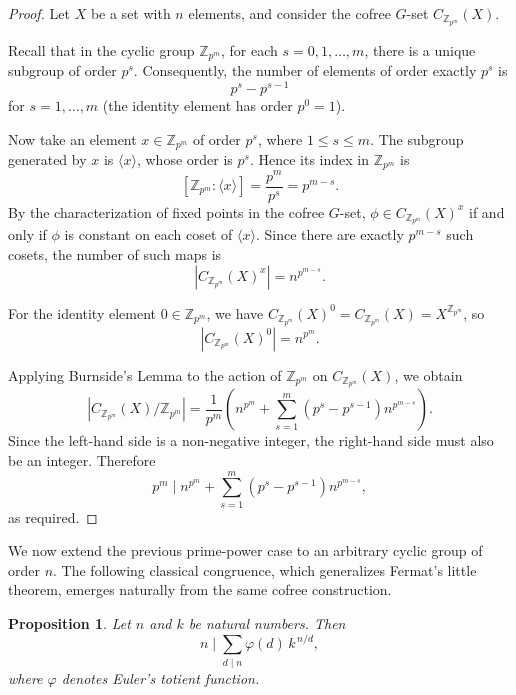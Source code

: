 \documentclass[10pt,a4paper]{amsart}
\newtheorem{proposition}{Proposition}
\begin{document}
\begin{proof}
Let $X$ be a set with $n$ elements, and consider the cofree $G$-set $C_{\mathbb{Z}_{p^m}}(X)$.

Recall that in the cyclic group $\mathbb{Z}_{p^m}$, for each $s = 0, 1, \dots, m$, there is a unique subgroup of order $p^s$. Consequently, the number of elements of order exactly $p^s$ is
\[
p^s - p^{s-1}
\]
for $s = 1, \dots, m$ (the identity element has order $p^0 = 1$).

Now take an element $x \in \mathbb{Z}_{p^m}$ of order $p^s$, where $1 \le s \le m$. The subgroup generated by $x$ is $\langle x \rangle$, whose order is $p^s$. Hence its index in $\mathbb{Z}_{p^m}$ is
\[
[\mathbb{Z}_{p^m} : \langle x \rangle] = \frac{p^m}{p^s} = p^{m-s}.
\]
By the characterization of fixed points in the cofree $G$-set, $\phi \in C_{\mathbb{Z}_{p^m}}(X)^x$ if and only if $\phi$ is constant on each coset of $\langle x \rangle$. Since there are exactly $p^{m-s}$ such cosets, the number of such maps is
\[
\left\lvert C_{\mathbb{Z}_{p^m}}(X)^x \right\rvert = n^{p^{m-s}}.
\]

For the identity element $0 \in \mathbb{Z}_{p^m}$, we have $C_{\mathbb{Z}_{p^m}}(X)^0 = C_{\mathbb{Z}_{p^m}}(X) = X^{\mathbb{Z}_{p^m}}$, so
\[
\left\lvert C_{\mathbb{Z}_{p^m}}(X)^0 \right\rvert = n^{p^m}.
\]

Applying Burnside's Lemma to the action of $\mathbb{Z}_{p^m}$ on $C_{\mathbb{Z}_{p^m}}(X)$, we obtain
\[
\left\lvert C_{\mathbb{Z}_{p^m}}(X)/\mathbb{Z}_{p^m} \right\rvert
= \frac{1}{p^m} \left( n^{p^m} + \sum_{s=1}^m (p^s - p^{s-1}) n^{p^{m-s}} \right).
\]
Since the left-hand side is a non-negative integer, the right-hand side must also be an integer. Therefore
\[
p^m \mid n^{p^m} + \sum_{s=1}^m (p^s - p^{s-1}) n^{p^{m-s}},
\]
as required.
\end{proof}

We now extend the previous prime-power case to an arbitrary cyclic group of order $n$. The following classical congruence, which generalizes Fermat's little theorem, emerges naturally from the same cofree construction.

\begin{proposition}\label{prop:fermat_general}
Let $n$ and $k$ be natural numbers. Then
\[
n \mid \sum_{d \mid n} \varphi(d)\, k^{\,n/d},
\]
where $\varphi$ denotes Euler's totient function.
\end{proposition}
\end{document}
